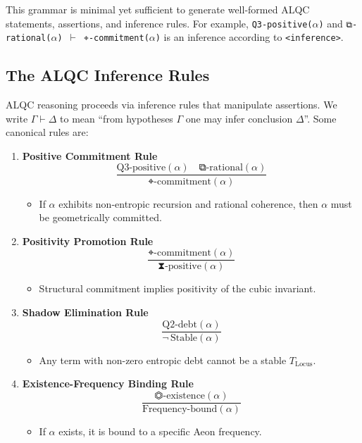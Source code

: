 \documentclass[11pt, letterpaper]{article}
\begin{document}
This grammar is minimal yet sufficient to generate well-formed ALQC statements, assertions, and inference rules. For example, \texttt{Q3-positive($\alpha$)} and \texttt{⧉-rational($\alpha$) $\vdash$ ⌖-commitment($\alpha$)} is an inference according to \texttt{<inference>}.

\subsection{The ALQC Inference Rules}

ALQC reasoning proceeds via inference rules that manipulate assertions. We write $\Gamma \vdash \Delta$ to mean ``from hypotheses $\Gamma$ one may infer conclusion $\Delta$''. Some canonical rules are:

\begin{enumerate}
    \item \textbf{Positive Commitment Rule}
    \[
    \frac{\text{Q3-positive}(\alpha) \quad \text{⧉-rational}(\alpha)}{\text{⌖-commitment}(\alpha)}
    \]
    \begin{itemize}
        \item If $\alpha$ exhibits non-entropic recursion and rational coherence, then $\alpha$ must be geometrically committed.
    \end{itemize}

    \item \textbf{Positivity Promotion Rule}
    \[
    \frac{\text{⌖-commitment}(\alpha)}{\text{⧗-positive}(\alpha)}
    \]
    \begin{itemize}
        \item Structural commitment implies positivity of the cubic invariant.
    \end{itemize}

    \item \textbf{Shadow Elimination Rule}
    \[
    \frac{\text{Q2-debt}(\alpha)}{\neg\, \text{Stable}(\alpha)}
    \]
    \begin{itemize}
        \item Any term with non-zero entropic debt cannot be a stable $T_{\text{Locus}}$.
    \end{itemize}

    \item \textbf{Existence-Frequency Binding Rule}
    \[
    \frac{\text{⏣-existence}(\alpha)}{\text{Frequency-bound}(\alpha)}
    \]
    \begin{itemize}
        \item If $\alpha$ exists, it is bound to a specific Aeon frequency.
    \end{itemize}


\end{enumerate}
\end{document}
